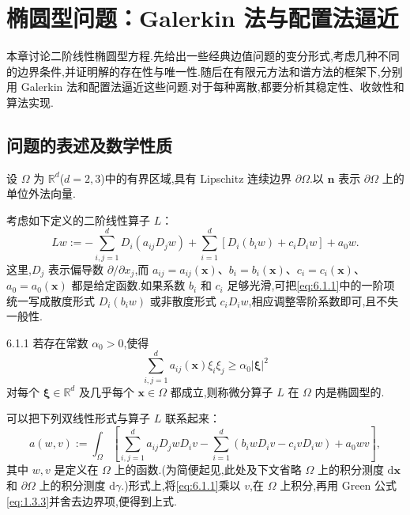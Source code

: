\chapter{椭圆型问题：Galerkin 法与配置法逼近}\label{ch:6}

本章讨论二阶线性椭圆型方程.先给出一些经典边值问题的变分形式,考虑几种不同的边界条件,并证明解的存在性与唯一性.随后在有限元方法和谱方法的框架下,分别用 Galerkin 法和配置法逼近这些问题.对于每种离散,都要分析其稳定性、收敛性和算法实现.

\section{问题的表述及数学性质}\label{sec:6.1}

设 \(\Omega\) 为 \(\mathbb R^d\)(\(d=2,3\))中的有界区域,具有 Lipschitz 连续边界 \(\partial\Omega\).以 \(\boldsymbol{n}\) 表示 \(\partial\Omega\) 上的单位外法向量.

考虑如下定义的二阶线性算子 \(L\)：
\begin{equation}\label{eq:6.1.1}
  Lw:=-\sum_{i,j=1}^d D_i(a_{ij}D_jw)
        +\sum_{i=1}^d[D_i(b_iw)+c_iD_iw]+a_0w.
\end{equation}
这里,\(D_j\) 表示偏导数 \(\partial/\partial x_j\),而 \(a_{ij}=a_{ij}(\boldsymbol{x})\)、\(b_i=b_i(\boldsymbol{x})\)、\(c_i=c_i(\boldsymbol{x})\)、\(a_0=a_0(\boldsymbol{x})\) 都是给定函数.如果系数 \(b_i\) 和 \(c_i\) 足够光滑,可把\eqref{eq:6.1.1}中的一阶项统一写成散度形式 \(D_i(b_iw)\) 或非散度形式 \(c_iD_iw\),相应调整零阶系数即可,且不失一般性.

\begin{definition}[]{6.1.1}
若存在常数 \(\alpha_0>0\),使得
\[
  \sum_{i,j=1}^d a_{ij}(\boldsymbol{x})\xi_i\xi_j
     \ge\alpha_0|\boldsymbol{\xi}|^2
\]
对每个 \(\boldsymbol{\xi}\in\mathbb R^d\) 及几乎每个 \(\boldsymbol{x}\in\Omega\) 都成立,则称微分算子 \(L\) 在 \(\Omega\) 内是{\heiti 椭圆型的}.
\end{definition}

可以把下列双线性形式与算子 \(L\) 联系起来：
\begin{equation}\label{eq:6.1.2}
  a(w,v):=\int_\Omega\left[
     \sum_{i,j=1}^d a_{ij}D_jwD_iv
     -\sum_{i=1}^d(b_iwD_iv-c_ivD_iw)+a_0wv
  \right],
\end{equation}
其中 \(w,v\) 是定义在 \(\Omega\) 上的函数.(为简便起见,此处及下文省略 \(\Omega\) 上的积分测度 \(\mathrm d\boldsymbol{x}\) 和 \(\partial\Omega\) 上的积分测度 \(\mathrm d\gamma\).)形式上,将\eqref{eq:6.1.1}乘以 \(v\),在 \(\Omega\) 上积分,再用 Green 公式\eqref{eq:1.3.3}并舍去边界项,便得到上式.

